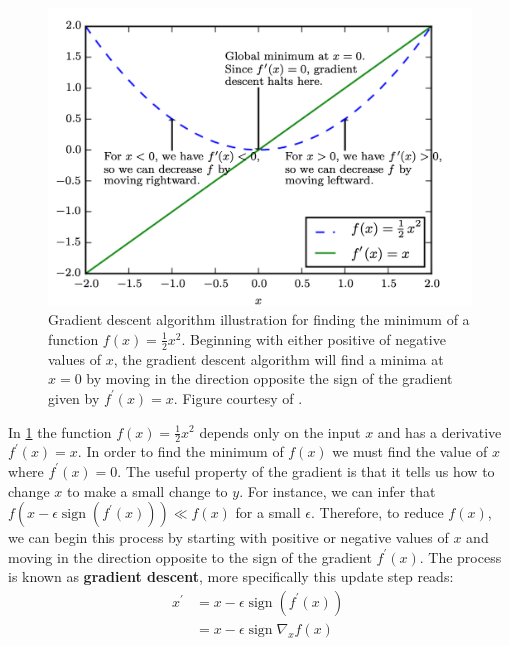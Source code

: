 \begin{figure}[ht]
    \centering
    \captionsetup{justification=RaggedRight}
    \includegraphics[scale=0.15]{chapters/assets/gradient_descent_basic.png}
    \caption{Gradient descent algorithm illustration for finding the minimum of a function $f(x) = \frac{1}{2}x^2$. Beginning with either positive of negative values of $x$, the gradient descent algorithm will find a minima at $x=0$ by moving in the direction opposite the sign of the gradient given by $f^\prime(x)=x$. Figure courtesy of \textcite{GoodfellowDLBook2016}.}
    \label{fig:gradient-descent}
\end{figure}

In \cref{fig:gradient-descent} the function $f(x)=\frac{1}{2}x^2$ depends only on the input $x$ and has a derivative \(f^\prime(x)=x\). In order to find the minimum of $f(x)$ we must find the value of $x$ where $f^\prime(x)=0$. The useful property of the gradient is that it tells us how to change $x$ to make a small change to $y$. For instance, we can infer that $f\left(x-\epsilon \operatorname{sign}\left(f^{\prime}(x)\right)\right) \ll f(x)$ for a small $\epsilon$. 
Therefore, to reduce $f(x)$, we can begin this process by starting with positive or negative values of $x$ and moving in the direction opposite to the sign of the gradient $f^\prime(x)$. The process is known as \textbf{gradient descent}, more specifically this update step reads:
\begin{align}
    x^\prime &=x-\epsilon \operatorname{sign}\left(f^{\prime}(x)\right) \nonumber \\
    &= x-\epsilon \operatorname{sign}\nabla_x f(x) \quad
\end{align}

